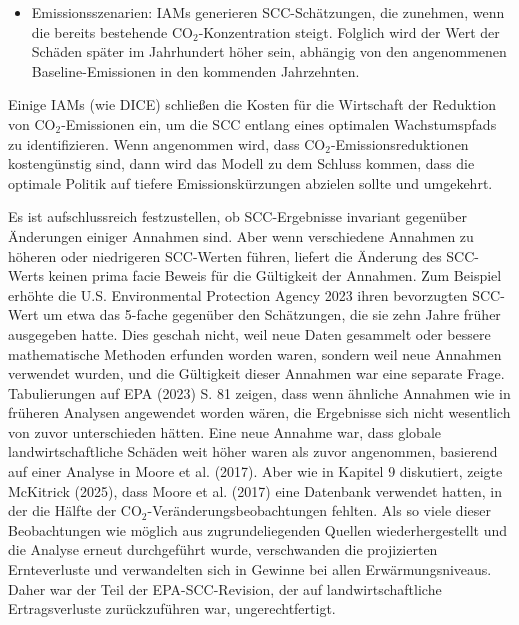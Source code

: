 \documentclass[12pt,paper=a4,DIV=12,parskip=never,chapterprefix=false,headings=standardclasses]{scrreprt}
\begin{document}
\begin{itemize}
\item Emissionsszenarien: IAMs generieren SCC-Schätzungen, die zunehmen, wenn die bereits bestehende CO$_2$-Konzentration steigt. Folglich wird der Wert der Schäden später im Jahrhundert höher sein, abhängig von den angenommenen Baseline-Emissionen in den kommenden Jahrzehnten.
\end{itemize}

Einige IAMs (wie DICE) schließen die Kosten für die Wirtschaft der Reduktion von CO$_2$-Emissionen ein, um die SCC entlang eines optimalen Wachstumspfads zu identifizieren. Wenn angenommen wird, dass CO$_2$-Emissionsreduktionen kostengünstig sind, dann wird das Modell zu dem Schluss kommen, dass die optimale Politik auf tiefere Emissionskürzungen abzielen sollte und umgekehrt.

Es ist aufschlussreich festzustellen, ob SCC-Ergebnisse invariant gegenüber Änderungen einiger Annahmen sind. Aber wenn verschiedene Annahmen zu höheren oder niedrigeren SCC-Werten führen, liefert die Änderung des SCC-Werts keinen prima facie Beweis für die Gültigkeit der Annahmen. Zum Beispiel erhöhte die U.S. Environmental Protection Agency 2023 ihren bevorzugten SCC-Wert um etwa das 5-fache gegenüber den Schätzungen, die sie zehn Jahre früher ausgegeben hatte. Dies geschah nicht, weil neue Daten gesammelt oder bessere mathematische Methoden erfunden worden waren, sondern weil neue Annahmen verwendet wurden, und die Gültigkeit dieser Annahmen war eine separate Frage. Tabulierungen auf EPA (2023) S. 81 zeigen, dass wenn ähnliche Annahmen wie in früheren Analysen angewendet worden wären, die Ergebnisse sich nicht wesentlich von zuvor unterschieden hätten. Eine neue Annahme war, dass globale landwirtschaftliche Schäden weit höher waren als zuvor angenommen, basierend auf einer Analyse in Moore et al. (2017). Aber wie in Kapitel 9 diskutiert, zeigte McKitrick (2025), dass Moore et al. (2017) eine Datenbank verwendet hatten, in der die Hälfte der CO$_2$-Veränderungsbeobachtungen fehlten. Als so viele dieser Beobachtungen wie möglich aus zugrundeliegenden Quellen wiederhergestellt und die Analyse erneut durchgeführt wurde, verschwanden die projizierten Ernteverluste und verwandelten sich in Gewinne bei allen Erwärmungsniveaus. Daher war der Teil der EPA-SCC-Revision, der auf landwirtschaftliche Ertragsverluste zurückzuführen war, ungerechtfertigt.
\end{document}
